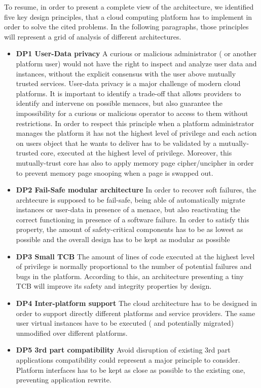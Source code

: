 \documentclass{acm_proc_article-sp} %
\begin{document}
To resume, in order to present a complete view of the architecture, we identified five key design principles, that a cloud computing platform has to implement in order to solve the cited problems. In the following paragraphs, those principles will represent a grid of analysis of different architectures.
\begin{itemize}[]
\item \textbf{DP1 User-Data privacy} A curious or malicious administrator ( or another platform user) would not have the right to inspect and analyze user data and instances, without the explicit consensus with the user above mutually trusted services. User-data privacy is a major challenge of modern cloud platforms. It is important to identify a trade-off that allows providers to identify and intervene on possible menaces, but also guarantee the impossibility for a curious or malicious operator to access to them without restrictions. In order to respect this principle when a platform administrator manages the platform it has not the highest level of privilege and each action on users object that he wants to deliver has to be validated by a mutually-trusted core, executed at the highest level of privilege. Moreover, this mutually-trust core has also to apply memory page cipher/uncipher in order to prevent memory page snooping when a page is swapped out.
\item \textbf{DP2 Fail-Safe modular architecture} In order to recover soft failures, the archtecure is supposed to be fail-safe, being able of automatically migrate instances or user-data in presence of a menace, but also reactivating the correct functioning in presence of a software failure. In order to satisfy this property, the amount of safety-critical components has to be as lowest as possible and the overall design has to be kept as modular as possible
\item \textbf{DP3 Small TCB} The amount of lines of code executed at the highest level of privilege is normally proportional to the number of potential failures and bugs in the platform. According to this, an architecture presenting a tiny TCB will improve its safety and integrity properties by design.
\item \textbf{DP4 Inter-platform support} The cloud architecture has to be designed in order to support directly different platforms and service providers. The same user virtual instances have to be executed ( and potentially migrated) unmodified over different platforms.
\item \textbf{DP5 3rd part compatibility} Avoid disruption of existing 3rd part applications compatibility could represent a major principle to consider. Platform interfaces has to be kept as close as possible to the existing one, preventing application rewrite.
\end{itemize}
\end{document}
